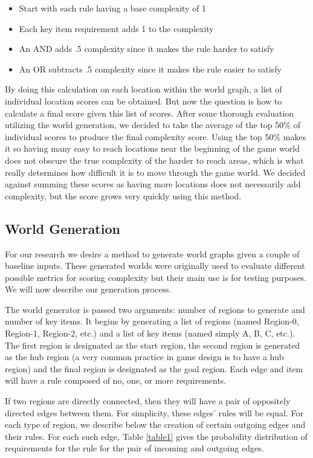 \documentclass{ieeeaccess}
\begin{document}
\begin{itemize}
    \item Start with each rule having a base complexity of 1
    \item Each key item requirement adds 1 to the complexity
    \item An AND adds .5 complexity since it makes the rule harder to satisfy
    \item An OR subtracts .5 complexity since it makes the rule easier to satisfy
\end{itemize}

By doing this calculation on each location within the world graph, a list of individual
location scores can be obtained. But now the question is how to calculate a final score given
this list of scores. After some thorough evaluation utilizing the world generation, we decided
to take the average of the top 50\% of individual scores to produce the final complexity score.
Using the top 50\% makes it so having many easy to reach locations near the beginning of the
game world does not obscure the true complexity of the harder to reach areas, which is what
really determines how difficult it is to move through the game world. We decided against
summing these scores as having more locations does not necessarily add complexity, but the
score grows very quickly using this method.


\subsection{World Generation}
For our research we desire a method to generate world graphs given a couple of baseline inputs.
These generated worlds were originally used to evaluate different possible metrics for scoring
complexity but their main use is for testing purposes. We will now describe our generation
process.

The world generator is passed two arguments: 
number of regions to generate and number of key items. 
It begins by generating a list of regions (named Region-0, Region-1, Region-2, etc.) and a list
of key items (named simply A, B, C, etc.). 
The first region is designated as the start region, the second region is generated as the hub
region (a very common practice in game design is to have a hub region) and the final region is
designated as the goal region.
Each edge and item will have a rule composed of no, one, or more requirements.

If two regions are directly connected,
then they will have a pair of oppositely directed edges
between them.
For simplicity, these edges' rules will be equal.
For each type of region, we describe below the creation of 
certain outgoing edges and their rules.
For each such edge, Table \ref{table1} gives the probability distribution of 
requirements for the rule for the pair of incoming and outgoing edges.
\end{document}
